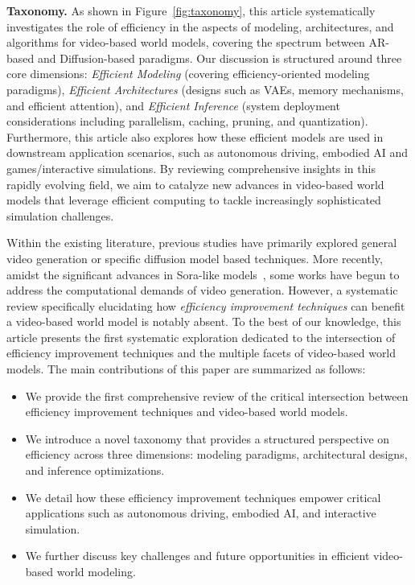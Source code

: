 \documentclass[lettersize,journal]{IEEEtran}
\begin{document}


\textbf{Taxonomy.} As shown in Figure~\ref{fig:taxonomy}, this article systematically investigates the role of efficiency in the aspects of modeling, architectures, and algorithms for video-based world models, covering the spectrum between AR-based and Diffusion-based paradigms. Our discussion is structured around three core dimensions: \textit{Efficient Modeling} (covering efficiency-oriented modeling paradigms), \textit{Efficient Architectures} (designs such as VAEs, memory mechanisms, and efficient attention), and \textit{Efficient Inference} (system deployment considerations including parallelism, caching, pruning, and quantization). Furthermore, this article also explores how these efficient models are used in downstream application scenarios, such as autonomous driving, embodied AI and games/interactive simulations. By reviewing comprehensive insights in this rapidly evolving field, we aim to catalyze new advances in video-based world models that leverage efficient computing to tackle increasingly sophisticated simulation challenges.

Within the existing literature, previous studies have primarily explored general video generation or specific diffusion model based techniques. More recently, amidst the significant advances in Sora-like models~\cite{videoworldsimulators2024}, some works have begun to address the computational demands of video generation. However, a systematic review specifically elucidating how \textit{efficiency improvement techniques} can benefit a video-based world model is notably absent. To the best of our knowledge, this article presents the first systematic exploration dedicated to the intersection of efficiency improvement techniques and the multiple facets of video-based world models. The main contributions of this paper are summarized as follows:

\begin{itemize}
\item We provide the first comprehensive review of the critical intersection between efficiency improvement techniques and video-based world models.
\item We introduce a novel taxonomy that provides a structured perspective on efficiency across three dimensions: modeling paradigms, architectural designs, and inference optimizations.
\item We detail how these efficiency improvement techniques empower critical applications such as autonomous driving, embodied AI, and interactive simulation.
\item We further discuss key challenges and future opportunities in efficient video-based world modeling.
\end{itemize}
\end{document}
